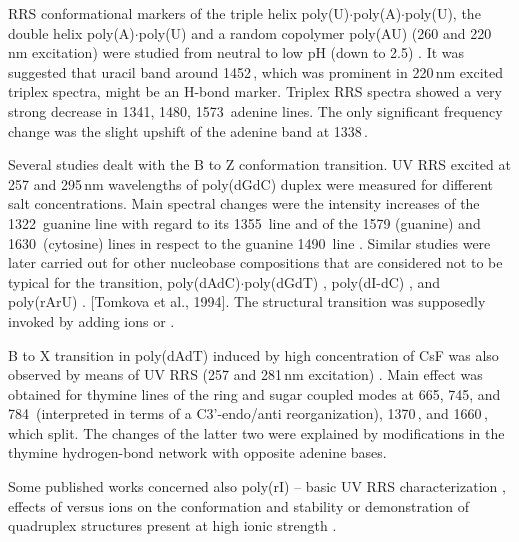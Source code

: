 RRS conformational markers of the triple helix
poly(U)$\cdot$poly(A)$\cdot$poly(U), the double helix poly(A)$\cdot$poly(U) and
a random copolymer poly(AU) (260 and 220\,nm excitation) were studied from
neutral to low pH (down to 2.5)
\parencite{Gfrorer1993a}.
It was suggested that uracil band around 1452\,\icm{}, which was prominent in
220\,nm excited triplex spectra, might be an H-bond marker.
Triplex RRS spectra showed a very strong decrease in 1341, 1480, 1573\,\icm{}
adenine lines.
The only significant frequency change was the slight upshift of the adenine
band at 1338\,\icm{}.

Several studies dealt with the B to Z conformation transition.
UV RRS excited at 257 and 295\,nm wavelengths of poly(dGdC) duplex were
measured for different salt concentrations.
Main spectral changes were the intensity increases of the 1322\,\icm{} guanine
line with regard to its 1355\,\icm{} line and of the 1579 (guanine) and
1630\,\icm{} (cytosine) lines in respect to the guanine 1490\,\icm{} line
\parencite{Jolles1984}.
Similar studies were later carried out for other nucleobase compositions that
are considered not to be typical for the transition,
poly(dAdC)$\cdot$poly(dGdT)
\parencite{Miskovsky1992},
poly(dI-dC)
\parencite{Tomkova1993},
and poly(rArU)
\parencite{Tomkova1994}.
[Tomkova et al., 1994].
The structural transition was supposedly invoked by adding  ions or
.

B to X transition in poly(dAdT) induced by high concentration of CsF was also
observed by means of UV RRS (257 and 281\,nm excitation)
\parencite{Tomkova1995}.
Main effect was obtained for thymine lines of the ring and sugar coupled modes
at 665, 745, and 784\,\icm{} (interpreted in terms of a C3'-endo/anti
reorganization), 1370\,\icm{}, and 1660\,\icm{}, which split.
The changes of the latter two were explained by modifications in the thymine
 hydrogen-bond network with opposite adenine bases.

Some published works concerned also poly(rI) -- basic UV RRS characterization
\parencite{Ulicny1994},
effects of  versus  ions on the conformation and stability
\parencite{Mukerji1998}
or demonstration of quadruplex structures present at high ionic strength
\parencite{Wheeler1996}.
